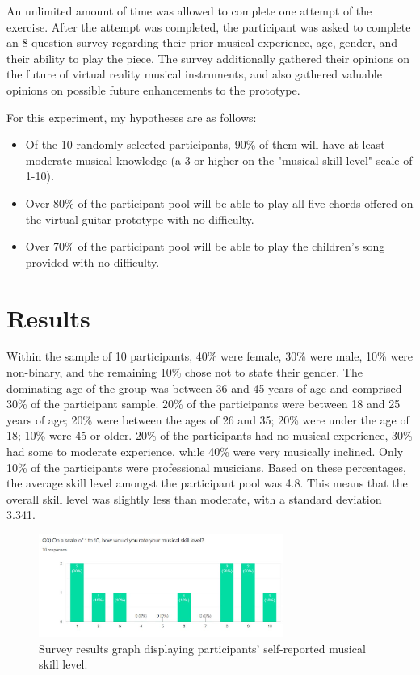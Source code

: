 \documentclass{vgtc}                          %
\begin{document}
An unlimited amount of time was allowed to complete one attempt of the exercise. After the attempt was completed, the participant was asked to complete an 8-question survey regarding their prior musical experience, age, gender, and their ability to play the piece. The survey additionally gathered their opinions on the future of virtual reality musical instruments, and also gathered valuable opinions on possible future enhancements to the prototype.

For this experiment, my hypotheses are as follows:
\begin{itemize}
    \item Of the 10 randomly selected participants, 90\% of them will have at least moderate musical knowledge (a 3 or higher on the "musical skill level" scale of 1-10).   
    \item Over 80\% of the participant pool will be able to play all five chords offered on the virtual guitar prototype with no difficulty.
    \item Over 70\% of the participant pool will be able to play the children's song provided with no difficulty.
\end{itemize}

\section{Results}
Within the sample of 10 participants, 40\% were female, 30\% were male, 10\% were non-binary, and the remaining 10\% chose not to state their gender. The dominating age of the group was between 36 and 45 years of age and comprised 30\% of the participant sample. 20\% of the participants were between 18 and 25 years of age; 20\% were between the ages of 26 and 35; 20\% were under the age of 18; 10\% were 45 or older. 20\% of the participants had no musical experience, 30\% had some to moderate experience, while 40\% were very musically inclined. Only 10\% of the participants were professional musicians. Based on these percentages, the average skill level amongst the participant pool was 4.8. This means that the overall skill level was slightly less than moderate, with a standard deviation 3.341.

\begin{figure}[h]
\centering
\includegraphics[width=8cm]{pictures/Survey_Skill_Level_Q3.JPG}
\centering
\caption{Survey results graph displaying participants' self-reported musical skill level.}
\end{figure}
\end{document}

